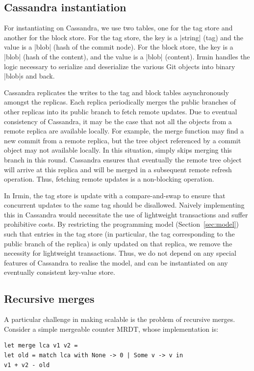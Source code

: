 \subsection{Cassandra instantiation}

For instantiating \name on Cassandra, we use two tables, one for the tag store
and another for the block store. For the tag store, the key is a |string| (tag)
and the value is a |blob| (hash of the commit node). For the block store, the
key is a |blob| (hash of the content), and the value is a |blob| (content).
Irmin handles the logic necessary to serialize and deserialize the various Git
objects into binary |blob|s and back.

Cassandra replicates the writes to the tag and block tables asynchronously
amongst the replicas. Each replica periodically merges the public branches of
other replicas into its public branch to fetch remote updates. Due to eventual
consistency of Cassandra, it may be the case that not all the objects from a
remote replica are available locally. For example, the merge function may find
a new commit from a remote replica, but the tree object referenced by a commit
object may not available locally. In this situation, \name simply skips merging
this branch in this round. Cassandra ensures that eventually the remote tree
object will arrive at this replica and will be merged in a subsequent remote
refresh operation. Thus, fetching remote updates is a non-blocking operation.

In Irmin, the tag store is update with a compare-and-swap to ensure that
concurrent updates to the same tag should be disallowed. Naively implementing
this in Cassandra would necessitate the use of lightweight transactions and
suffer prohibitive costs. By restricting the \name programming model
(Section~\ref{sec:model}) such that entries in the tag store (in particular,
the tag corresponding to the public branch of the replica) is only updated on
that replica, we remove the necessity for lightweight transactions. Thus, we
do not depend on any special features of Cassandra to realise the \name model,
and \name can be instantiated on any eventually consistent key-value store.

\subsection{Recursive merges}
\label{sec:rec_merge}

A particular challenge in making \name scalable is the problem of recursive
merges. Consider a simple mergeable counter MRDT, whose implementation is:
\begin{lstlisting}
let merge lca v1 v2 =
let old = match lca with None -> 0 | Some v -> v in
v1 + v2 - old
\end{lstlisting}

